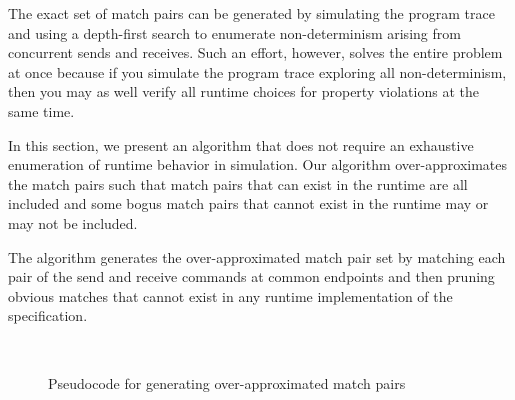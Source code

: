 The exact set of match pairs can be generated by simulating the
program trace and using a depth-first search to enumerate
non-determinism arising from concurrent sends and receives. Such an
effort, however, solves the entire problem at once because if you
simulate the program trace exploring all non-determinism, then you may
as well verify all runtime choices for property violations at the same
time. 

In this section, we present an algorithm that does not require
an exhaustive enumeration of runtime behavior in simulation. Our
algorithm over-approximates the match pairs such that match pairs that
can exist in the runtime are all included and some bogus match
pairs that cannot exist in the runtime may or may not be included.


The algorithm generates the over-approximated match pair set by
matching each pair of the send and receive commands at common
endpoints and then pruning obvious matches that cannot exist in any
runtime implementation of the specification.

\begin{figure}[h]
\setlength{\tabcolsep}{20pt}
\begin{center}
\scalebox{0.7}{\usebox{\boxalgorithm}}\\
\end{center}
\caption{Pseudocode for generating over-approximated match pairs}
\label{fig:pseudocode}
\end{figure}

